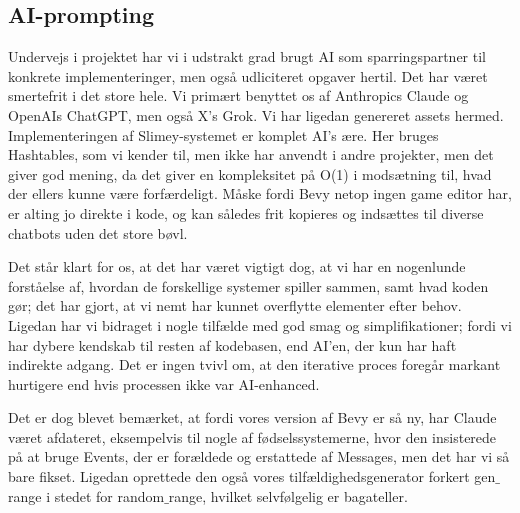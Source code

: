 \subsection{AI-prompting}
Undervejs i projektet har vi i udstrakt grad brugt AI som sparringspartner til konkrete implementeringer, men også udliciteret opgaver hertil. Det har været smertefrit i det store hele. Vi primært benyttet os af Anthropics Claude og OpenAIs ChatGPT, men også X's Grok. Vi har ligedan genereret assets hermed. Implementeringen af Slimey-systemet er komplet AI's ære. Her bruges Hashtables, som vi kender til, men ikke har anvendt i andre projekter, men det giver god mening, da det giver en kompleksitet på O(1) i modsætning til, hvad der ellers kunne være forfærdeligt. Måske fordi Bevy netop ingen game editor har, er alting jo direkte i kode, og kan således frit kopieres og indsættes til diverse chatbots uden det store bøvl.

Det står klart for os, at det har været vigtigt dog, at vi har en nogenlunde forståelse af, hvordan de forskellige systemer spiller sammen, samt hvad koden gør; det har gjort, at vi nemt har kunnet overflytte elementer efter behov. Ligedan har vi bidraget i nogle tilfælde med god smag og simplifikationer; fordi vi har dybere kendskab til resten af kodebasen, end AI'en, der kun har haft indirekte adgang. Det er ingen tvivl om, at den iterative proces foregår markant hurtigere end hvis processen ikke var AI-enhanced.

Det er dog blevet bemærket, at fordi vores version af Bevy er så ny, har Claude været afdateret, eksempelvis til nogle af fødselssystemerne, hvor den insisterede på at bruge Events, der er forældede og erstattede af Messages, men det har vi så bare fikset. Ligedan oprettede den også vores tilfældighedsgenerator forkert gen$\_$range i stedet for random$\_$range, hvilket selvfølgelig er bagateller.

